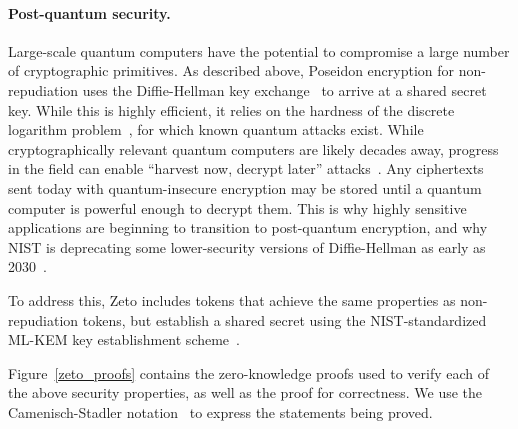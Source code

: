 \paragraph{Post-quantum security.} Large-scale quantum computers have the potential to compromise a large number of cryptographic primitives. As described above, Poseidon encryption for non-repudiation uses the Diffie-Hellman key exchange~\cite{TODO} to arrive at a shared secret key. While this is highly efficient, it relies on the hardness of the discrete logarithm problem~\cite{TODO}, for which known quantum attacks exist. While cryptographically relevant quantum computers are likely decades away, progress in the field can enable ``harvest now, decrypt later'' attacks~\cite{TODO}. Any ciphertexts sent today with quantum-insecure encryption may be stored until a quantum computer is powerful enough to decrypt them. This is why highly sensitive applications are beginning to transition to post-quantum encryption, and why NIST is deprecating some lower-security versions of Diffie-Hellman as early as 2030~\cite{TODO}.

To address this, Zeto includes tokens that achieve the same properties as non-repudiation tokens, but establish a shared secret using the NIST-standardized ML-KEM key establishment scheme~\cite{TODO}.

Figure~\ref{zeto_proofs} contains the zero-knowledge proofs used to verify each of the above security properties, as well as the proof for correctness. We use the Camenisch-Stadler notation~\cite{TODO} to express the statements being proved.

